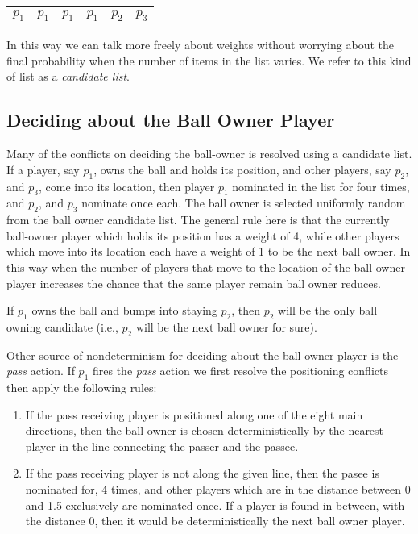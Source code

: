 \documentclass[12pt,titlepage,a4paper]{article}
\begin{document}
\bigskip
\begin{center}
\begin{tabular}{|c|c|c|c|c|c|} \hline
$p_1$ & $p_1$ & $p_1$ & $p_1$ & $p_2$ & $p_3$ \\ \hline
\end{tabular}
\end{center}

In this way we can talk more freely about weights without worrying about the final probability when the number of items in the list varies. We refer to this kind of list as a \emph{candidate list}.

\subsection{Deciding about the Ball Owner Player}

Many of the conflicts on deciding the ball-owner is resolved using a candidate list. If a player, say $p_1$, owns the ball and holds its position, and other players, say $p_2$, and $p_3$, come into its location, then player $p_1$ nominated in the list for four times, and $p_2$, and $p_3$ nominate once each. The ball owner is selected uniformly random from the ball owner candidate list. The general rule here is that the currently ball-owner player which holds its position has a weight of 4, while other players which move into its location each have a weight of 1 to be the next ball owner. In this way when the number of players that move to the location of the ball owner player increases the chance that the same player remain ball owner reduces.

If $p_1$ owns the ball and bumps into staying $p_2$, then $p_2$ will be the only ball owning candidate (i.e., $p_2$ will be the next ball owner for sure).

Other source of nondeterminism for deciding about the ball owner player is the \emph{pass} action. If $p_1$ fires the \emph{pass} action we first resolve the positioning conflicts then apply the following rules:

\begin{enumerate}
\item If the pass receiving player is positioned along one of the eight main directions, then the ball owner is chosen deterministically by the nearest player in the line connecting the passer and the passee.

\item If the pass receiving player is not along the given line, then the pasee is nominated for, 4 times, and other players which are in the distance between 0 and 1.5 exclusively are nominated once. If a player is found in between, with the distance 0, then it would be deterministically the next ball owner player.
\end{enumerate}
\end{document}
